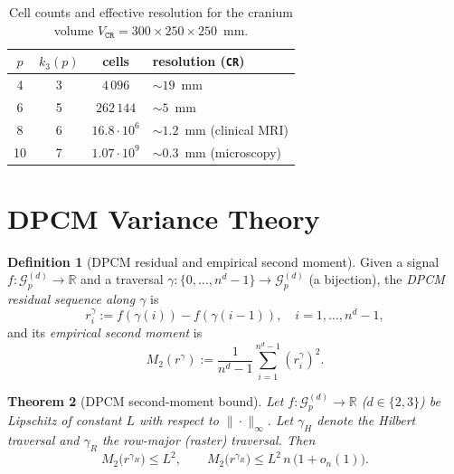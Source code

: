 \documentclass[11pt,a4paper]{article}
\theoremstyle{plain}
\newtheorem{theorem}{Theorem}[section]
\theoremstyle{definition}
\newtheorem{definition}[theorem]{Definition}
\theoremstyle{remark}
\newcommand{\R}{\mathbb{R}}
\newcommand{\Grid}{\mathcal{G}}
\begin{document}
\begin{table}[!htbp]
\centering
\small
\begin{tabular}{cccl}
\toprule
$p$ & $k_3(p)$ & cells & resolution (\texttt{CR}) \\
\midrule
4  & 3 & $4\,096$ & $\sim 19$~mm \\
6  & 5 & $262\,144$ & $\sim 5$~mm \\
8  & 6 & $16.8\cdot 10^6$ & $\sim 1.2$~mm (clinical MRI) \\
10 & 7 & $1.07\cdot 10^9$ & $\sim 0.3$~mm (microscopy) \\
\bottomrule
\end{tabular}
\caption{Cell counts and effective resolution for the cranium volume
$V_{\mathtt{CR}} = 300\times 250\times 250$~mm.}
\label{tab:resolution}
\end{table}

\section{DPCM Variance Theory}\label{sec:dpcm}

\begin{definition}[DPCM residual and empirical second moment]\label{def:dpcm}
Given a signal $f:\Grid_p^{(d)}\to\R$ and a traversal
$\gamma:\{0,\dots,n^d-1\}\to\Grid_p^{(d)}$ (a bijection), the
\emph{DPCM residual sequence along $\gamma$} is
\[
r^\gamma_i := f(\gamma(i)) - f(\gamma(i-1)),\quad i=1,\dots,n^d-1,
\]
and its \emph{empirical second moment} is
\[
M_2(r^\gamma) := \frac{1}{n^d-1}\sum_{i=1}^{n^d-1} (r^\gamma_i)^2.
\]
\end{definition}

\begin{theorem}[DPCM second-moment bound]\label{thm:dpcm}
Let $f:\Grid_p^{(d)}\to\R$ ($d\in\{2,3\}$) be Lipschitz of constant $L$
with respect to $\|\cdot\|_\infty$. Let $\gamma_H$ denote the Hilbert
traversal and $\gamma_R$ the row-major (raster) traversal. Then
\[
M_2\bigl(r^{\gamma_H}\bigr) \leq L^2,
\qquad
M_2\bigl(r^{\gamma_R}\bigr) \leq L^2\,n\,\bigl(1 + o_n(1)\bigr).
\]
\end{theorem}
\end{document}
